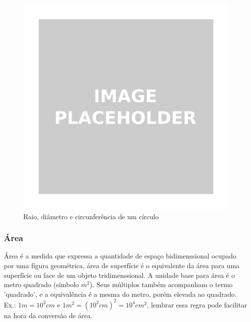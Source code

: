 \begin{multicols*}{2}
    \begin{figure}[H]
        \centering
        \includegraphics[width=0.7\columnwidth]{assets/image_placeholder.png}
        \caption{Raio, diâmetro e circunferência de um círculo}
     \end{figure}

    \subsubsection*{Área}
    Área é a medida que expressa a quantidade de espaço bidimenssional ocupado por uma fígura geométrica, 
    área de superfície é o equivalente da área para uma superfície ou face de um objeto tridimenssional. A unidade base 
    para área é o metro quadrado (símbolo ${m^2}$). Seus múltiplos também acompanham o termo 'quadrado', 
    e a equivalência é a mesma do metro, porém elevada ao quadrado. Ex.: $1m = 10^2cm$ e $1m^2 = (10^2cm)^2 = 10^4cm^2$,
    lembrar essa regra pode facilitar na hora da conversão de área.


\end{multicols*}
